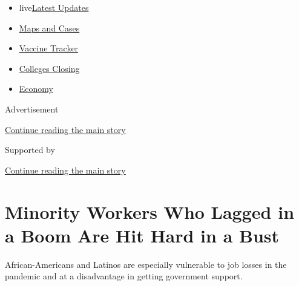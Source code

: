 \begin{itemize}
\tightlist
\item
  live\href{https://www.nytimes3xbfgragh.onion/2020/08/20/world/coronavirus-covid.html?name=styln-coronavirus-markets\&region=TOP_BANNER\&variant=undefined\&block=storyline_menu_recirc\&action=click\&pgtype=Article\&impression_id=59999931-e387-11ea-90be-b975cb723b3c}{Latest
  Updates}
\item
  \href{https://www.nytimes3xbfgragh.onion/interactive/2020/us/coronavirus-us-cases.html?name=styln-coronavirus-markets\&region=TOP_BANNER\&variant=undefined\&block=storyline_menu_recirc\&action=click\&pgtype=Article\&impression_id=59999932-e387-11ea-90be-b975cb723b3c}{Maps
  and Cases}
\item
  \href{https://www.nytimes3xbfgragh.onion/interactive/2020/science/coronavirus-vaccine-tracker.html?name=styln-coronavirus-markets\&region=TOP_BANNER\&variant=undefined\&block=storyline_menu_recirc\&action=click\&pgtype=Article\&impression_id=59999933-e387-11ea-90be-b975cb723b3c}{Vaccine
  Tracker}
\item
  \href{https://www.nytimes3xbfgragh.onion/2020/08/19/us/colleges-closing-covid.html?name=styln-coronavirus-markets\&region=TOP_BANNER\&variant=undefined\&block=storyline_menu_recirc\&action=click\&pgtype=Article\&impression_id=59999934-e387-11ea-90be-b975cb723b3c}{Colleges
  Closing}
\item
  \href{https://www.nytimes3xbfgragh.onion/live/2020/08/20/business/stock-market-today-coronavirus?name=styln-coronavirus-markets\&region=TOP_BANNER\&variant=undefined\&block=storyline_menu_recirc\&action=click\&pgtype=Article\&impression_id=59999935-e387-11ea-90be-b975cb723b3c}{Economy}
\end{itemize}

Advertisement

\protect\hyperlink{after-top}{Continue reading the main story}

Supported by

\protect\hyperlink{after-sponsor}{Continue reading the main story}

\hypertarget{minority-workers-who-lagged-in-a-boom-are-hit-hard-in-a-bust}{%
\section{Minority Workers Who Lagged in a Boom Are Hit Hard in a
Bust}\label{minority-workers-who-lagged-in-a-boom-are-hit-hard-in-a-bust}}

African-Americans and Latinos are especially vulnerable to job losses in
the pandemic and at a disadvantage in getting government support.

